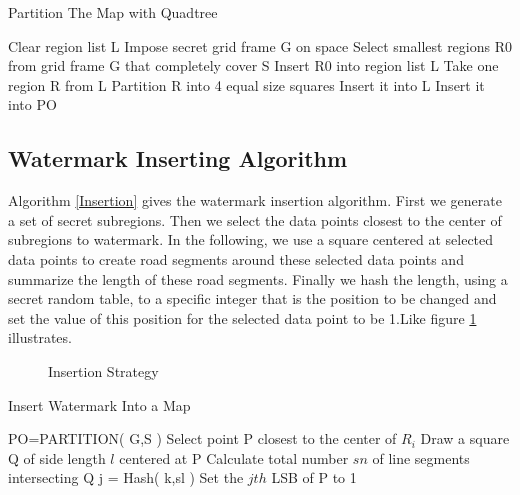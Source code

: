 \begin{algorithm}[h]
\caption{Partition The Map with Quadtree}
\label{Partition}
\begin{algorithmic}[1]

\State Clear region list L
\State Impose secret grid frame G on space
\State Select smallest regions R0 from grid frame G that completely cover S
\State Insert R0 into region list L
\State Take one region R from L
\State Partition R into 4 equal size squares
\State Insert it into L
\Else{}
\State Insert it into PO
\EndIf
\EndWhile
\EndProcedure
\end{algorithmic}
\end{algorithm}


\subsection{Watermark Inserting Algorithm}
Algorithm \ref{Insertion} gives the watermark insertion algorithm. First
we generate a set of secret subregions. Then we select the
data points closest to the center of subregions to watermark.
In the following, we use a square centered at selected data
points to create road segments around these selected data
points and summarize the length of these road segments.
Finally we hash the length, using a secret random table, to a specific integer that is the
position to be changed and set the value of this position for
the selected data point to be 1.Like figure \ref{fig:13} illustrates.

\begin{figure}[h]
\centering
{}
\caption{Insertion Strategy}
\label{fig:13}
\end{figure} 


\begin{algorithm}[h]
\caption{Insert Watermark Into a Map}
\label{Insertion}
\begin{algorithmic}[1]

\State PO=PARTITION( G,S )
\State Select point P closest to the center of ${R}_{i}$
\State Draw a square Q of side length $l$ centered at P
\State Calculate total number $sn$ of line segments intersecting Q
\State j = Hash( k,sl )
\State Set the $jth$ LSB of P to 1
\EndIf
\EndFor
\EndProcedure
\end{algorithmic}
\end{algorithm}


